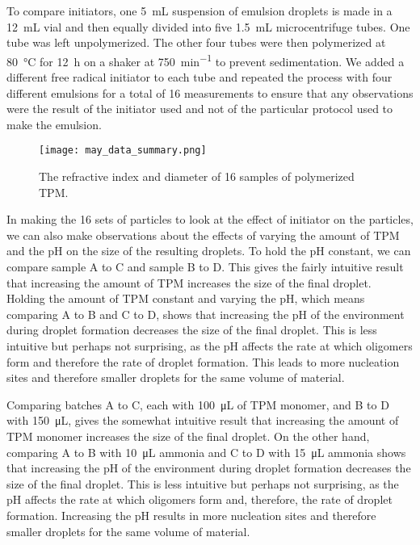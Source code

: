 To compare initiators, one \SI{5}{\milli \liter} suspension of emulsion droplets is
made in a \SI{12}{\milli \liter} vial and then equally divided into five
\SI{1.5}{\milli \liter} microcentrifuge tubes. One tube was left unpolymerized. The
other four tubes were then polymerized at \SI{80}{\celsius} 
for \SI{12}{\hour} on a shaker at \SI{750}{\minute^{-1}} %
to prevent sedimentation.
We added a different free radical initiator to each tube and repeated the process with four
different emulsions for a total of 
\num{16} measurements to ensure that any observations were the result of the 
initiator used and not of the particular protocol used to make the emulsion.



\begin{figure}
    \centering
    \texttt{[image: may\_data\_summary.png]}
    \caption{The refractive index and diameter of 16 samples of 
    polymerized TPM.}
    \label{fig:initiator_data}
\end{figure}

In making the \si{16} sets of particles to look at the effect of initiator on 
the particles, we can also make observations about the effects of varying 
the amount of TPM and the pH on the size of the resulting droplets. To hold 
the pH constant, we can compare sample A to C and sample B to D. This gives 
the fairly intuitive result that increasing the amount of TPM increases the 
size of the final droplet. Holding the amount of TPM constant and varying 
the pH, which means comparing A to B and C to D, shows that increasing the 
pH of the environment during droplet formation decreases the size of the 
final droplet. This is less intuitive but perhaps not surprising, as the pH 
affects the rate at which oligomers form and therefore the rate of droplet 
formation. This leads to more nucleation sites and therefore smaller droplets 
for the same volume of material. 

Comparing batches A to C, each with \SI{100}{\micro \liter} of TPM monomer, and B to D with
\SI{150}{\micro \liter}, gives the somewhat intuitive result that increasing the amount of TPM
monomer increases the size of the final droplet. On the other hand, comparing A to B with
\SI{10}{\micro \liter} ammonia and C to D with \SI{15}{\micro \liter} ammonia shows that
increasing the pH of the environment during droplet formation decreases the size of the 
final droplet. This is less intuitive but perhaps not surprising, as the pH 
affects the rate at which oligomers form and, therefore, the rate of droplet 
formation. Increasing the pH results in more nucleation sites and therefore smaller droplets 
for the same volume of material. 

